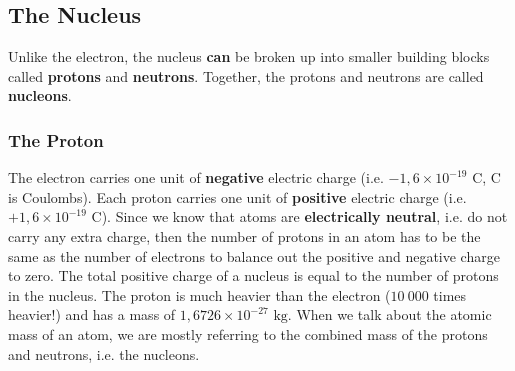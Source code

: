             \subsection*{The Nucleus}
            \nopagebreak
Unlike the electron, the nucleus \textbf{can} be broken up into smaller building blocks called \textbf{protons} and \textbf{neutrons}. Together, the protons and neutrons are called \textbf{nucleons}.
        \label{m38745*uid12}
            \subsubsection*{The Proton}
 The electron carries one unit of \textbf{negative} electric charge (i.e.\@{} $-1,6 \times {10}^{-19} \text{ C}$, C is Coulombs).
           \nopagebreak
          \label{m38745*id255338}Each proton carries one unit of \textbf{positive} electric charge (i.e.\@{} $+1,6 \times {10}^{-19} \text{ C}$).
Since we know that atoms are \textbf{electrically neutral}, i.e.\@{} do not carry any extra charge, then the number of protons in an atom has to be the same as the number of electrons to balance out the positive and negative charge to zero. The total positive charge of a nucleus is equal to the number of protons in the nucleus. The proton is much heavier than the electron ($10~000$ times heavier!) and has a mass of $1,6726 \times {10}^{-27} \text{ kg}$. When we talk about the atomic mass of an atom, we are mostly referring to the combined mass of the protons and neutrons, i.e.\@{} the nucleons.
        \label{m38745*uid13}
